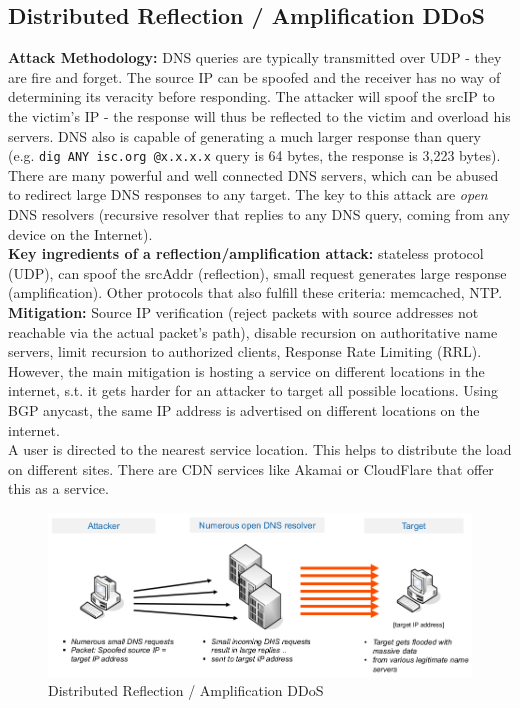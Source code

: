 \documentclass[11pt,oneside,a4paper]{article}
\begin{document}
\subsection{Distributed Reflection / Amplification DDoS}
\label{dns_ddos}

\textbf{Attack Methodology:} DNS queries are typically transmitted over UDP - they are fire and forget. The source IP can be spoofed and the receiver has no way of determining its veracity before responding. The attacker will spoof the srcIP to the victim's IP - the response will thus be reflected to the victim and overload his servers. DNS also is capable of generating a much larger response than query (e.g. \texttt{dig ANY isc.org @x.x.x.x} query is 64 bytes, the response is 3,223 bytes). There are many powerful and well connected DNS servers, which can be abused to redirect large DNS responses to any target. The key to this attack are \textit{open} DNS resolvers (recursive resolver that replies to any DNS query, coming from any device
on the Internet).\\
\noindent \textbf{Key ingredients of a reflection/amplification attack:} stateless protocol (UDP), can spoof the srcAddr (reflection), small request generates large response (amplification). Other protocols that also fulfill these criteria: memcached, NTP.\\
\noindent \textbf{Mitigation:} Source IP verification (reject packets with source addresses not reachable via the actual packet’s path), disable recursion on authoritative name servers, limit recursion to authorized clients, Response Rate Limiting (RRL).\\
However, the main mitigation is hosting a service on different locations in the internet, s.t. it gets harder for an attacker to target all possible locations. Using BGP anycast, the same IP address is advertised on different locations on the internet.\\
A user is directed to the nearest service location. This helps to distribute the load on different sites. There are CDN services like Akamai or CloudFlare that offer this as a service.

\begin{figure}[hb]
	\centering
	\includegraphics[width=0.7\linewidth]{figures/dns_reflection_amplification_ddos}
	\caption{Distributed Reflection / Amplification DDoS}
	\label{fig:dnsreflectionamplificationddos}
\end{figure}
\end{document}
